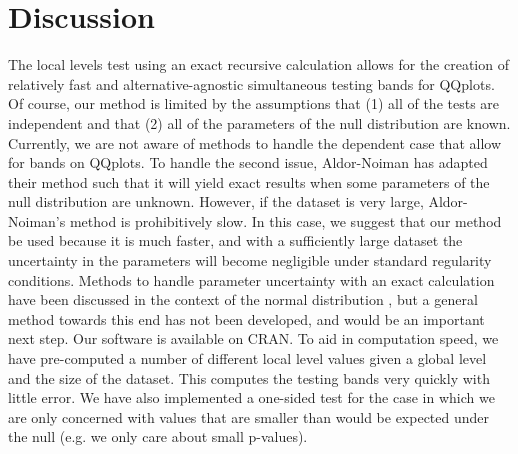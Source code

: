 \documentclass[article]{jss}
\begin{document}
\section{Discussion}
\label{sec:methods}
The local levels test using an exact recursive calculation allows for the creation of relatively fast and alternative-agnostic simultaneous testing bands for QQplots. Of course, our method is limited by the assumptions that (1) all of the tests are independent and that (2) all of the parameters of the null distribution are known. Currently, we are not aware of methods to handle the dependent case that allow for bands on QQplots. To handle the second issue, Aldor-Noiman has adapted their method such that it will yield exact results when some parameters of the null distribution are unknown. However, if the dataset is very large, Aldor-Noiman's method is prohibitively slow. In this case, we suggest that our method be used because it is much faster, and with a sufficiently large dataset the uncertainty in the parameters will become negligible under standard regularity conditions. Methods to handle parameter uncertainty with an exact calculation have been discussed in the context of the normal distribution \citep{rosenkrantz2000confidence}, but a general method towards this end has not been developed, and would be an important next step.
\newline
\newline
Our software is available on CRAN. To aid in computation speed, we have pre-computed a number of different local level values given a global level and the size of the dataset. This computes the testing bands very quickly with little error. We have also implemented a one-sided test for the case in which we are only concerned with values that are smaller than would be expected under the null (e.g. we only care about small p-values).


%
\end{document}
